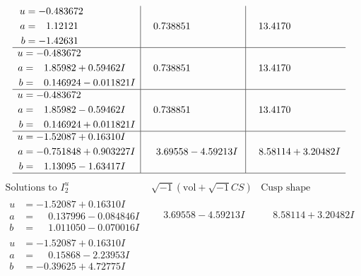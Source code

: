 \documentclass[1p]{elsarticle_modified}
\theoremstyle{definition}
\newcommand{\I}{\sqrt{-1}}
\begin{document}
$$\begin{array}{c|c|c}
\begin{aligned}
u &= -0.483672\phantom{ +0.000000I} \\
a &= \phantom{-}1.12121\phantom{ +0.000000I} \\
b &= -1.42631\phantom{ +0.000000I}\end{aligned}
 & \phantom{-}0.738851\phantom{ +0.000000I} & \phantom{-}13.4170\phantom{ +0.000000I} \\ \hline\begin{aligned}
u &= -0.483672\phantom{ +0.000000I} \\
a &= \phantom{-}1.85982 + 0.59462 I \\
b &= \phantom{-}0.146924 - 0.011821 I\end{aligned}
 & \phantom{-}0.738851\phantom{ +0.000000I} & \phantom{-}13.4170\phantom{ +0.000000I} \\ \hline\begin{aligned}
u &= -0.483672\phantom{ +0.000000I} \\
a &= \phantom{-}1.85982 - 0.59462 I \\
b &= \phantom{-}0.146924 + 0.011821 I\end{aligned}
 & \phantom{-}0.738851\phantom{ +0.000000I} & \phantom{-}13.4170\phantom{ +0.000000I} \\ \hline\begin{aligned}
u &= -1.52087 + 0.16310 I \\
a &= -0.751848 + 0.903227 I \\
b &= \phantom{-}1.13095 - 1.63417 I\end{aligned}
 & \phantom{-}3.69558 - 4.59213 I & \phantom{-}8.58114 + 3.20482 I\\
 \hline 
 \end{array}$$\newpage$$\begin{array}{c|c|c}  
\text{Solutions to }I^u_{2}& \I (\text{vol} + \sqrt{-1}CS) & \text{Cusp shape}\\
 \hline 
\begin{aligned}
u &= -1.52087 + 0.16310 I \\
a &= \phantom{-}0.137996 - 0.084846 I \\
b &= \phantom{-}1.011050 - 0.070016 I\end{aligned}
 & \phantom{-}3.69558 - 4.59213 I & \phantom{-}8.58114 + 3.20482 I \\ \hline\begin{aligned}
u &= -1.52087 + 0.16310 I \\
a &= \phantom{-}0.15868 - 2.23953 I \\
b &= -0.39625 + 4.72775 I\end{aligned}

\end{array}$$
\end{document}
